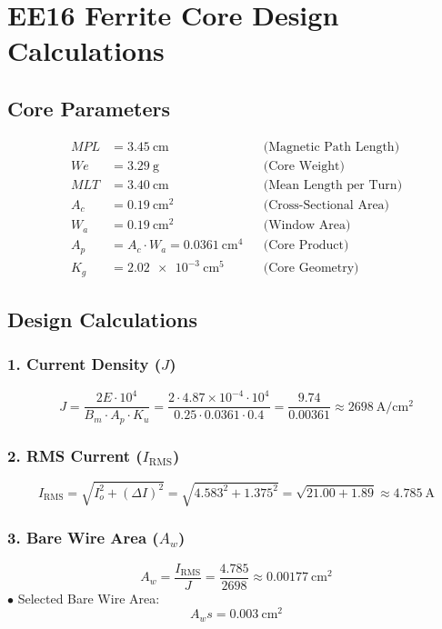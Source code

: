 \documentclass{article}
\begin{document}
\section*{EE16 Ferrite Core Design Calculations}

\subsection*{Core Parameters}
\begin{align*}
MPL &= \SI{3.45}{\centi\meter} & &\text{(Magnetic Path Length)} \\
We &= \SI{3.29}{\gram} & &\text{(Core Weight)} \\
MLT &= \SI{3.40}{\centi\meter} & &\text{(Mean Length per Turn)} \\
A_c &= \SI{0.19}{\centi\meter\squared} & &\text{(Cross-Sectional Area)} \\
W_a &= \SI{0.19}{\centi\meter\squared} & &\text{(Window Area)} \\
A_p &= A_c \cdot W_a = \SI{0.0361}{\centi\meter\tothe{4}} & &\text{(Core Product)} \\
K_g &= \SI{2.02e-3}{\centi\meter\tothe{5}} & &\text{(Core Geometry)}
\end{align*}

\subsection*{Design Calculations}

\subsubsection*{1. Current Density (\( J \))}
\[
J = \frac{2E \cdot 10^4}{B_m \cdot A_p \cdot K_u} 
  = \frac{2 \cdot 4.87 \times 10^{-4} \cdot 10^4}{0.25 \cdot 0.0361 \cdot 0.4} 
  = \frac{9.74}{0.00361} 
  \approx \SI{2698}{\ampere\per\centi\meter\squared}
\]

\subsubsection*{2. RMS Current (\( I_{\text{RMS}} \))}
\[
I_{\text{RMS}} = \sqrt{I_o^2 + (\Delta I)^2} 
  = \sqrt{4.583^2 + 1.375^2} 
  = \sqrt{21.00 + 1.89} 
  \approx \SI{4.785}{\ampere}
\]

\subsubsection*{3. Bare Wire Area (\( A_w \))}
\[
A_w = \frac{I_{\text{RMS}}}{J} 
  = \frac{4.785}{2698} 
  \approx \SI{0.00177}{\centi\meter\squared}
\]
$\bullet$ Selected Bare Wire Area:
\[
    A_ws = \SI{0.003}{\centi\meter\squared}
\]
\end{document}
